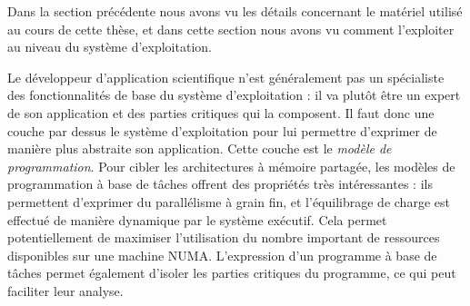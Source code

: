 \bigskip

Dans la section précédente nous avons vu les détails concernant le matériel utilisé au cours de cette thèse, et dans cette section nous avons vu comment l'exploiter au niveau du système d'exploitation.

Le développeur d'application scientifique n'est généralement pas un spécialiste des fonctionnalités de base du système d'exploitation : il va plutôt être un expert de son application et des parties critiques qui la composent.
Il faut donc une couche par dessus le système d'exploitation pour lui permettre d'exprimer de manière plus abstraite son application. Cette couche est le \emph{modèle de programmation}.
Pour cibler les architectures à mémoire partagée, les modèles de programmation à base de tâches offrent des propriétés très intéressantes : ils permettent d'exprimer du parallélisme à grain fin, et l'équilibrage de charge est effectué de manière dynamique par le système exécutif.
Cela permet potentiellement de maximiser l'utilisation du nombre important de ressources disponibles sur une machine NUMA.
L'expression d'un programme à base de tâches permet également d'isoler les parties critiques du programme, ce qui peut faciliter leur analyse.

